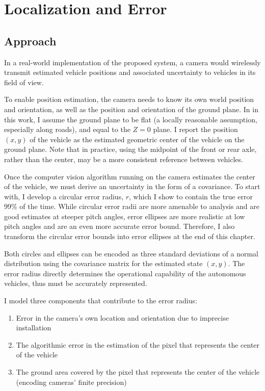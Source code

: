 \documentclass[a4paper,12pt,twoside,openright]{report}
\begin{document}
\section{Localization and Error}

\subsection{Approach}

In a real-world implementation of the proposed system, a camera would wirelessly
transmit estimated vehicle positions and associated uncertainty to vehicles in its field of view.

To enable position estimation, the camera needs to know its own world position and orientation, 
as well as the position and orientation of the ground plane. In in this work,
I assume the ground plane to be flat (a locally reasonable assumption, especially along roads), 
and equal to the $Z = 0$ plane. I report the position $(x,y)$ of the vehicle
as the estimated geometric center of the vehicle on the ground plane. 
Note that in practice, using the midpoint of the front or rear axle, rather than the center, 
may be a more consistent reference between vehicles.

Once the computer vision algorithm running on the camera estimates the center of the vehicle,
we must derive an uncertainty in the form of a covariance.  To start with, I develop a
circular error radius, $r$, which I show to contain
the true error 99\% of the time. While circular error radii are more amenable to analysis and are good
estimates at steeper pitch angles, error ellipses are more realistic at low pitch angles and are an 
even more accurate error bound. Therefore, I also transform the circular error bounds into error ellipses at the end of this chapter.

Both circles and ellipses can be encoded as three standard deviations of a normal distribution
using the covariance matrix for the estimated state $(x,y)$. The error radius directly determines
the operational capability of the autonomous vehicles, thus must be accurately represented.

I model three components that contribute to the error radius:
\begin{enumerate}
    \item Error in the camera's own location and orientation due to imprecise installation
    \item The algorithmic error in the estimation of the pixel that represents the center of the vehicle
    \item The ground area covered by the pixel that represents the center of the vehicle (encoding cameras' finite precision)
\end{enumerate}
 
\end{document}
